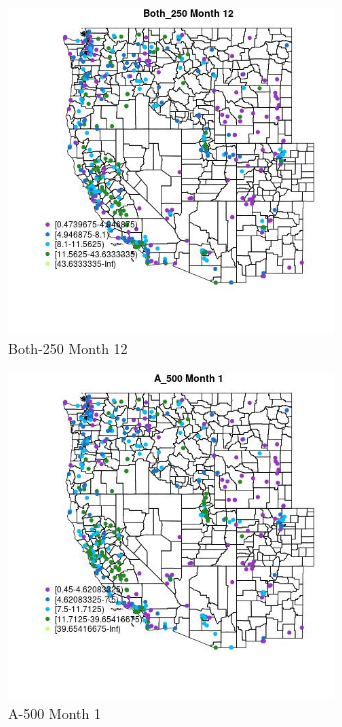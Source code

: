 \begin{figure} 
\centering  
\includegraphics[width=0.77\textwidth]{Code_Outputs/ML_input_report_ML_input_PM25_Step5_part_d_de_duplicated_aves_ML_input_MapObsMo12Both_250.jpg} 
\caption{\label{fig:ML_input_report_ML_input_PM25_Step5_part_d_de_duplicated_aves_ML_inputMapObsMo12Both_250}Both-250 Month 12} 
\end{figure} 
 

\begin{figure} 
\centering  
\includegraphics[width=0.77\textwidth]{Code_Outputs/ML_input_report_ML_input_PM25_Step5_part_d_de_duplicated_aves_ML_input_MapObsMo1A_500.jpg} 
\caption{\label{fig:ML_input_report_ML_input_PM25_Step5_part_d_de_duplicated_aves_ML_inputMapObsMo1A_500}A-500 Month 1} 
\end{figure} 
 

